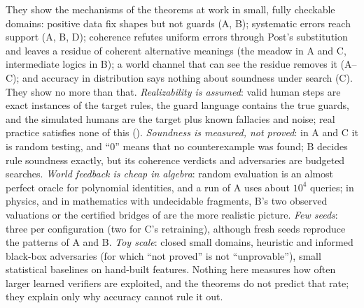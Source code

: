 They show the mechanisms of the theorems at work in small, fully checkable domains: positive data fix shapes but not guards (A, B); systematic errors reach support (A, B, D); coherence refutes uniform errors through Post's substitution and leaves a residue of coherent alternative meanings (the meadow in A and C, intermediate logics in B); a world channel that can see the residue removes it (A--C); and accuracy in distribution says nothing about soundness under search (C). They show no more than that. \emph{Realizability is assumed}: valid human steps are exact instances of the target rules, the guard language contains the true guards, and the simulated humans are the target plus known fallacies and noise; real practice satisfies none of this (). \emph{Soundness is measured, not proved}: in A and C it is random testing, and ``0'' means that no counterexample was found; B decides rule soundness exactly, but its coherence verdicts and adversaries are budgeted searches. \emph{World feedback is cheap in algebra}: random evaluation is an almost perfect oracle for polynomial identities, and a run of A uses about $10^4$ queries; in physics, and in mathematics with undecidable fragments, B's two observed valuations or the certified bridges of  are the more realistic picture. \emph{Few seeds}: three per configuration (two for C's retraining), although fresh seeds reproduce the patterns of A and B. \emph{Toy scale}: closed small domains, heuristic and informed black-box adversaries (for which ``not proved'' is not ``unprovable''), small statistical baselines on hand-built features. Nothing here measures how often larger learned verifiers are exploited, and the theorems do not predict that rate; they explain only why accuracy cannot rule it out.
